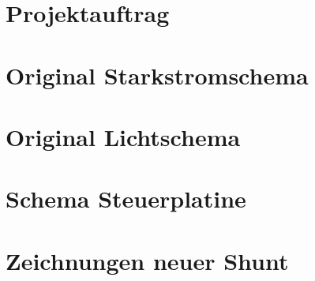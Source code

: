 \chapter{Projektauftrag}





\chapter{Original Starkstromschema}\label{schema_original}


\chapter{Original Lichtschema}\label{app:licht}


\chapter{Schema Steuerplatine}\label{Anh_Steuerplatine}



\chapter{Zeichnungen neuer Shunt}\label{app:2d}


